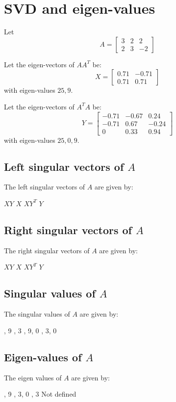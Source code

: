\documentclass{exam}
\begin{document}
\section{SVD and eigen-values}
Let
$$
  A=
\left[ {\begin{array}{ccc}
   3 & 2 & 2 \\
   2 & 3 & -2
  \end{array} } \right]
$$

Let the eigen-vectors of $AA^T$ be:
$$
X = 
\left[ \begin{array}{cc}
 0.71 & -0.71 \\
  0.71  & 0.71
\end{array} \right]
$$
with eigen-values $25, 9$.

Let the eigen-vectors of $A^TA$ be:
$$
Y = 
\left[\begin{array}{ccc}
-0.71 & -0.67 & 0.24 \\
-0.71 & 0.67 & -0.24 \\
0 & 0.33 & 0.94 
\end{array} \right]
$$
with eigen-values $25, 0, 9$.


\subsection{Left singular vectors of $A$}
The left singular vectors of $A$ are given by:
\begin{oneparchoices}
 \choice $XY$
 \choice $X$
 \choice $XY^T$
 \choice $Y$
\end{oneparchoices}

\subsection{Right singular vectors of $A$}
The right singular vectors of $A$ are given by:
\begin{oneparchoices}
 \choice $XY$
 \choice $X$
 \choice $XY^T$
 \choice $Y$
\end{oneparchoices}

\subsection{Singular values of $A$}
The singular values of $A$ are given by:
\begin{oneparchoices}
, 9
, 3
, 9, 0
, 3, 0
\end{oneparchoices}

\subsection{Eigen-values of $A$}
The eigen values of $A$ are given by:
\begin{oneparchoices}
, 9
, 3, 0
, 3
\choice Not defined
\end{oneparchoices}
\end{document}

